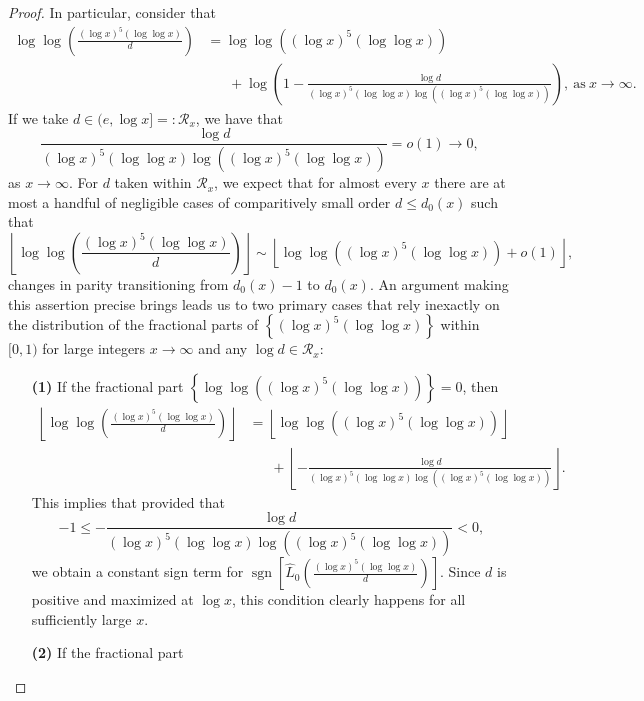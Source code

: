 \documentclass[11pt,reqno,a4letter]{article}
\numberwithin{figure}{section}
\numberwithin{table}{section}
\newcommand{\floor}[1]{\left\lfloor #1 \right\rfloor}
\theoremstyle{plain}
\numberwithin{theorem}{section}
\theoremstyle{definition}
\begin{document}
\begin{proof}
In particular, consider that 
\begin{align*} 
\log\log\left(\frac{(\log x)^{5} (\log\log x)}{d}\right) & = 
     \log\log\left((\log x)^{5} (\log\log x)\right) \\ 
     & \phantom{=\ } + \log\left(1 - 
     \frac{\log d}{(\log x)^{5} (\log\log x) \log\left( 
     (\log x)^{5} (\log\log x)\right)}\right), 
     \mathrm{\ as\ } x \rightarrow \infty. 
\end{align*} 
If we take $d \in (e, \log x] =: \mathcal{R}_x$, we have that 
$$\frac{\log d}{(\log x)^{5} (\log\log x) \log\left( 
 (\log x)^{5} (\log\log x)\right)} = o(1) \rightarrow 0,$$ 
as $x \rightarrow \infty$. 
For $d$ taken within $\mathcal{R}_x$, 
we expect that for almost every $x$ there are at most 
a handful of negligible cases of comparitively small order $d \leq d_0(x)$ such that 
\[
\floor{\log\log\left(\frac{(\log x)^{5} (\log\log x)}{d}\right)} \sim 
     \floor{\log\log\left((\log x)^{5} (\log\log x)\right) + o(1)}, 
\]
changes in parity transitioning from $d_0(x)-1$ to $d_0(x)$. 
An argument making this assertion precise brings leads us to 
two primary cases that rely inexactly on the distribution of the fractional parts 
of $\left\{(\log x)^{5} (\log\log x)\right\}$ within $[0, 1)$ for 
large integers $x \rightarrow \infty$ and any 
$\log d \in \mathcal{R}_x$: 
\begin{itemize}[itemsep=0pt,topsep=0pt,leftmargin=0.35in] 
\item[\textbf{(1)}] If the fractional part 
     $\left\{\log\log\left((\log x)^{5} (\log\log x)\right)\right\} = 0$, then 
     \begin{align*} 
     \floor{\log\log\left(\frac{(\log x)^{5} (\log\log x)}{d}\right)} & = 
          \floor{\log\log\left((\log x)^{5} (\log\log x)\right)} \\ 
          & \phantom{=\ } + 
          \floor{-\frac{\log d}{(\log x)^{5} (\log\log x) \log\left( 
          (\log x)^{5} (\log\log x)\right)}}. 
     \end{align*} 
     This implies that provided that 
     \[
     -1 \leq -\frac{\log d}{(\log x)^{5} (\log\log x) \log\left( 
          (\log x)^{5} (\log\log x)\right)} < 0, 
     \]
     we obtain a constant sign term for 
     $\operatorname{sgn}\left[\widehat{L}_0\left(\frac{(\log x)^{5} (\log\log x)}{d}\right)\right]$. 
     Since $d$ is positive and maximized at $\log x$, 
     this condition clearly happens for all sufficiently large $x$. 
\item[\textbf{(2)}] If the fractional part 

\end{itemize}
\end{proof}
\end{document}
